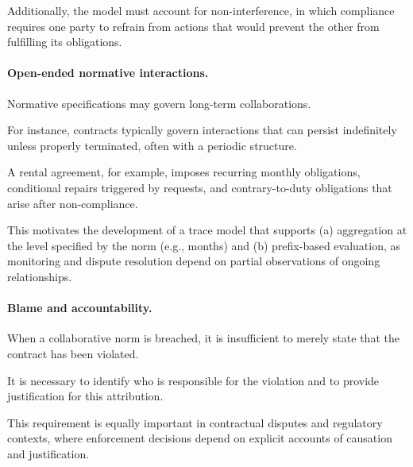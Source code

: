 \documentclass{article}
\begin{document}
Additionally, the model must account for non-interference, in which compliance requires one party to refrain from actions that would prevent the other from fulfilling its obligations.



\paragraph{Open-ended normative interactions.}

Normative specifications may govern long-term collaborations.

For instance, contracts typically govern interactions that can persist indefinitely unless properly terminated, often with a periodic structure.

A rental agreement, for example, imposes recurring monthly obligations, conditional repairs triggered by requests, and contrary-to-duty obligations that arise after non-compliance.

This motivates the development of a trace model that supports (a) aggregation at the level specified by the norm (e.g., months) and (b) prefix-based evaluation, as monitoring and dispute resolution depend on partial observations of ongoing relationships.



\paragraph{Blame and accountability.}

When a collaborative norm is breached, it is insufficient to merely state that the contract has been violated.

It is necessary to identify who is responsible for the violation and to provide justification for this attribution.

This requirement is equally important in contractual disputes and regulatory contexts, where enforcement decisions depend on explicit accounts of causation and justification.
\end{document}
